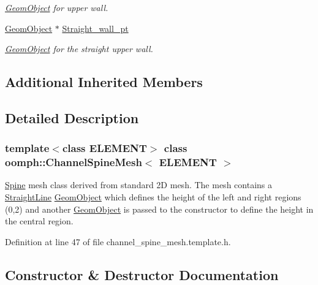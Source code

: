 \begin{DoxyCompactItemize}
\begin{DoxyCompactList}\small\item\em \hyperlink{classoomph_1_1GeomObject}{Geom\+Object} for upper wall. \end{DoxyCompactList}\item 
\hyperlink{classoomph_1_1GeomObject}{Geom\+Object} $\ast$ \hyperlink{classoomph_1_1ChannelSpineMesh_a34f4583f2aa944d5d1ff723f6a4123bf}{Straight\+\_\+wall\+\_\+pt}
\begin{DoxyCompactList}\small\item\em \hyperlink{classoomph_1_1GeomObject}{Geom\+Object} for the straight upper wall. \end{DoxyCompactList}\end{DoxyCompactItemize}
\subsection*{Additional Inherited Members}


\subsection{Detailed Description}
\subsubsection*{template$<$class E\+L\+E\+M\+E\+NT$>$\newline
class oomph\+::\+Channel\+Spine\+Mesh$<$ E\+L\+E\+M\+E\+N\+T $>$}

\hyperlink{classoomph_1_1Spine}{Spine} mesh class derived from standard 2D mesh. The mesh contains a \hyperlink{classoomph_1_1StraightLine}{Straight\+Line} \hyperlink{classoomph_1_1GeomObject}{Geom\+Object} which defines the height of the left and right regions (0,2) and another \hyperlink{classoomph_1_1GeomObject}{Geom\+Object} is passed to the constructor to define the height in the central region. 

Definition at line 47 of file channel\+\_\+spine\+\_\+mesh.\+template.\+h.



\subsection{Constructor \& Destructor Documentation}
\mbox{\label{classoomph_1_1ChannelSpineMesh_a9f8cdd0476807b44bccb7b1ae6f97a4a}} 
